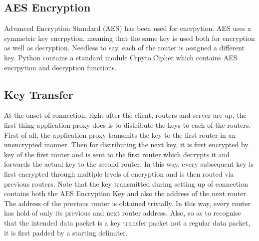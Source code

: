 \documentclass{article}
\begin{document}
\subsection*{AES Encryption}
Advanced Encryption Standard (AES) has been used for encrpytion. AES uses a symmetric key encrpytion, meaning that the same key is used both for encryption as well as decryption. Needless to say, each of the router is assigned a different key. Python contains a standard module Crpyto.Cipher which contains AES encrpytion and decryption functions.
\subsection*{Key Transfer}
At the onset of connection, right after the client, routers and server are up, the first thing application proxy does is to distribute the keys to each of the routers. First of all, the application proxy transmits the key to the first router in an unencrypted manner. Then for distributing the next key, it is first encrypted by key of the first router and is sent to the first router which decrypts it and forwards the actual key to the second router. In this way, every subsequent key is first encrypted through multiple levels of encryption and is then routed via previous routers.
\newline
\newline
Note that the key transmitted during setting up of connection contains both the AES Encryption Key and also the address of the next router. The address of the previous router is obtained trivially. In this way, every router has hold of only its previous and next router address. Also, so as to recognise that the intended data packet is a key transfer packet not a regular data packet, it is first padded by a starting delimiter.
\end{document}
